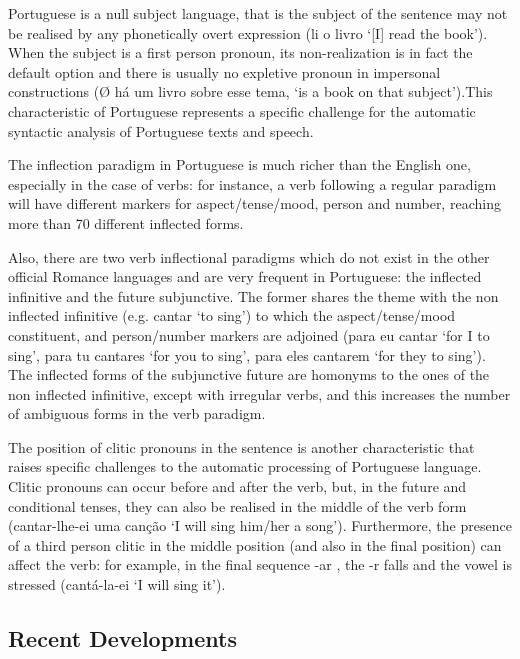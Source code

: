 \begin{multicols}{2}
Portuguese is a null subject language, that is the subject of the sentence may not be realised by any phonetically overt expression (li o livro ‘[I] read the book’). When the subject is a first person pronoun, its non-realization is in fact the default option and there is usually no expletive pronoun in impersonal constructions (Ø há um livro sobre esse tema, ‘is a book on that subject’).This characteristic of Portuguese represents a specific challenge for the automatic syntactic analysis of Portuguese texts and speech.

The inflection paradigm in Portuguese is much richer than the English one, especially in the case of verbs: for instance, a verb following a regular paradigm will have different markers for aspect/tense/mood, person and number, reaching more than 70 different inflected forms.


Also, there are two verb inflectional paradigms which do not exist in the other official Romance languages and are very frequent in Portuguese: the inflected infinitive and the future subjunctive.  The former shares the theme with the non inflected infinitive (e.g. cantar ‘to sing’) to which the aspect/tense/mood constituent, and person/number markers are adjoined (para eu cantar ‘for I to sing’, para tu cantares ‘for you to sing’, para eles cantarem ‘for they to sing’). The inflected forms of the subjunctive future are homonyms to the ones of the non inflected infinitive, except with irregular verbs, and this increases the number of ambiguous forms in the verb paradigm.

The position of clitic pronouns in the sentence is another characteristic that raises specific challenges to the automatic processing of Portuguese language. Clitic pronouns can occur before and after the verb, but, in the future and conditional tenses, they can also be realised in the middle of the verb form (cantar-lhe-ei uma canção ‘I will sing him/her a song’). Furthermore, the presence of a third person clitic in the middle position (and also in the final position) can affect the verb: for example, in the final sequence -ar , the -r falls and the vowel is stressed (cantá-la-ei ‘I will sing it’).

\subsection{Recent Developments}


\end{multicols}
